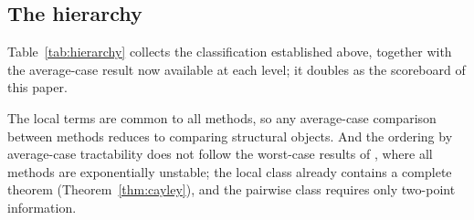 \subsection{The hierarchy}\label{sec:hierarchy}

Table~\ref{tab:hierarchy} collects the classification established above, together with the
average-case result now available at each level; it doubles as the scoreboard of this
paper.

\begin{table}[ht]
  \centering
  \footnotesize
  \setlength{\tabcolsep}{4pt}
  \caption{Summary of the average-case results, per method: the structural object, its
    class, and the leading behaviour of the average logarithmic conditioning ratio in the
    absolute metric. Pairwise entries are stated at $d=2$; the relative column follows the
    conversion of Section~\ref{sec:relative}.}
  \label{tab:hierarchy}
\end{table}

The local terms are common to all methods, so any average-case comparison between methods
reduces to comparing structural objects. And the ordering by average-case tractability
does not follow the worst-case results of \cite{graf2026numerical}, where all methods are
exponentially unstable; the local class already contains a complete theorem
(Theorem~\ref{thm:cayley}), and the pairwise class requires only two-point information.

